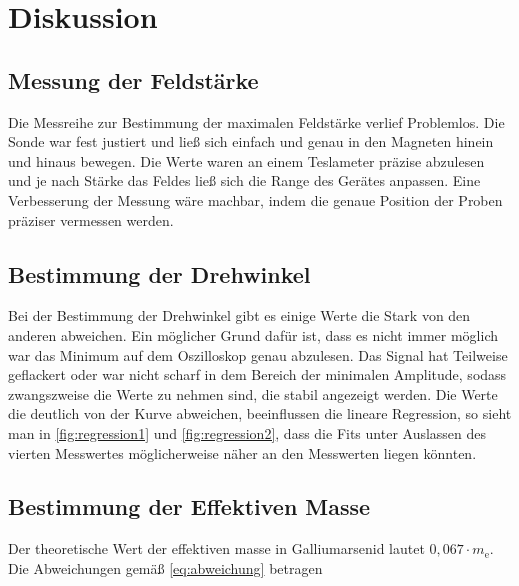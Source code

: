 \section{Diskussion}
\label{sec:Diskussion}

\subsection{Messung der Feldstärke}
Die Messreihe zur Bestimmung der maximalen Feldstärke verlief Problemlos. Die Sonde war fest 
justiert und ließ sich einfach und genau in den Magneten hinein und hinaus bewegen. Die Werte waren 
an einem Teslameter präzise abzulesen und je nach Stärke das Feldes ließ sich die Range des 
Gerätes anpassen. Eine Verbesserung der Messung wäre machbar, indem die genaue Position der Proben präziser vermessen werden.

\subsection{Bestimmung der Drehwinkel}
Bei der Bestimmung der Drehwinkel gibt es einige Werte die Stark von den anderen abweichen. Ein möglicher 
Grund dafür ist, dass es nicht immer möglich war das Minimum auf dem Oszilloskop genau abzulesen. Das Signal 
hat Teilweise geflackert oder war nicht scharf in dem Bereich der minimalen Amplitude, sodass zwangszweise die Werte 
zu nehmen sind, die stabil angezeigt werden. Die Werte die deutlich von der Kurve abweichen, beeinflussen die lineare Regression,
so sieht man in \autoref{fig:regression1} und \autoref{fig:regression2}, dass die Fits unter Auslassen des vierten Messwertes möglicherweise näher an den Messwerten
liegen könnten.

\subsection{Bestimmung der Effektiven Masse}
Der theoretische Wert der effektiven masse in Galliumarsenid lautet $0, 067 \cdot m_\text{e}$. Die Abweichungen gemäß \autoref{eq:abweichung} betragen

